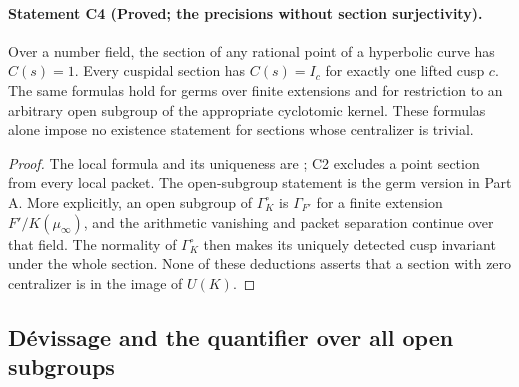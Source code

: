 \paragraph{Statement C4 (Proved; the precisions without section surjectivity).}\label{res:C4}
Over a number field, the section of any rational point of a hyperbolic curve has $C(s)=1$. Every cuspidal section has $C(s)=I_c$ for exactly one lifted cusp $c$. The same formulas hold for germs over finite extensions and for restriction to an arbitrary open subgroup of the appropriate cyclotomic kernel. These formulas alone impose no existence statement for sections whose centralizer is trivial.
\begin{proof}
The local formula and its uniqueness are \Rtwo; C2 excludes a point section from every local packet. The open-subgroup statement is the germ version in Part A. More explicitly, an open subgroup of $\Gamma_K^\circ$ is $\Gamma_{F'}$ for a finite extension $F'/K(\mu_\infty)$, and the arithmetic vanishing and packet separation continue over that field. The normality of $\Gamma_K^\circ$ then makes its uniquely detected cusp invariant under the whole section. None of these deductions asserts that a section with zero centralizer is in the image of $U(K)$.
\end{proof}

\subsection{Dévissage and the quantifier over all open subgroups}


